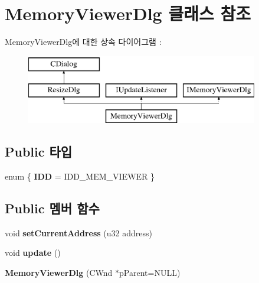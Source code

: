 \hypertarget{class_memory_viewer_dlg}{}\section{Memory\+Viewer\+Dlg 클래스 참조}
\label{class_memory_viewer_dlg}
Memory\+Viewer\+Dlg에 대한 상속 다이어그램 \+: \begin{figure}[H]
\begin{center}
\leavevmode
\includegraphics[height=3.000000cm]{class_memory_viewer_dlg}
\end{center}
\end{figure}
\subsection*{Public 타입}
\begin{DoxyCompactItemize}
\item 
\mbox{\label{class_memory_viewer_dlg_aca9567bd4cf2ec1aa5ac0473ce2d1fa2}} 
enum \{ {\bfseries I\+DD} = I\+D\+D\+\_\+\+M\+E\+M\+\_\+\+V\+I\+E\+W\+ER
 \}
\end{DoxyCompactItemize}
\subsection*{Public 멤버 함수}
\begin{DoxyCompactItemize}
\item 
\mbox{\label{class_memory_viewer_dlg_ac027e2a8dc226a7053068680050abd1f}} 
void {\bfseries set\+Current\+Address} (u32 address)
\item 
\mbox{\label{class_memory_viewer_dlg_a0222a6beddfef071bc19b8849dc4ee15}} 
void {\bfseries update} ()
\item 
\mbox{\label{class_memory_viewer_dlg_aed16c2ef99beec1b0ffa2c9b22cd0e5c}} 
{\bfseries Memory\+Viewer\+Dlg} (C\+Wnd $\ast$p\+Parent=N\+U\+LL)
\end{DoxyCompactItemize}
